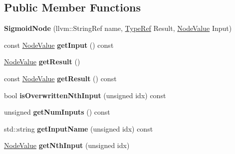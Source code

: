 \subsection*{Public Member Functions}
\begin{DoxyCompactItemize}
\item 
\mbox{\label{classglow_1_1_sigmoid_node_a4456d5661ba55534940bb83bc23a17de}} 
{\bfseries Sigmoid\+Node} (llvm\+::\+String\+Ref name, \hyperlink{structglow_1_1_type}{Type\+Ref} Result, \hyperlink{structglow_1_1_node_value}{Node\+Value} Input)
\item 
\mbox{\label{classglow_1_1_sigmoid_node_aef22bb5249ba8d7e54c2ac7e51a73f76}} 
const \hyperlink{structglow_1_1_node_value}{Node\+Value} {\bfseries get\+Input} () const
\item 
\mbox{\label{classglow_1_1_sigmoid_node_a148a5ba560cd02ef07ac05875833c251}} 
\hyperlink{structglow_1_1_node_value}{Node\+Value} {\bfseries get\+Result} ()
\item 
\mbox{\label{classglow_1_1_sigmoid_node_a849b79a25a0b22acf026c53fdadb7a99}} 
const \hyperlink{structglow_1_1_node_value}{Node\+Value} {\bfseries get\+Result} () const
\item 
\mbox{\label{classglow_1_1_sigmoid_node_a6f2b116ef5e4338797cabaa7a8efa592}} 
bool {\bfseries is\+Overwritten\+Nth\+Input} (unsigned idx) const
\item 
\mbox{\label{classglow_1_1_sigmoid_node_a39fc7b8869c27f626a96442d83b1df0b}} 
unsigned {\bfseries get\+Num\+Inputs} () const
\item 
\mbox{\label{classglow_1_1_sigmoid_node_a68706169b0c5ac61639d7bc2fe178e5f}} 
std\+::string {\bfseries get\+Input\+Name} (unsigned idx) const
\item 
\mbox{\label{classglow_1_1_sigmoid_node_a1511b5ce24195a6fafba8ffa4b091930}} 
\hyperlink{structglow_1_1_node_value}{Node\+Value} {\bfseries get\+Nth\+Input} (unsigned idx)
\item 
\mbox{\label{classglow_1_1_sigmoid_node_aa44e9d7a47a93c6139b325da0e50f5dc}} 

\end{DoxyCompactItemize}
